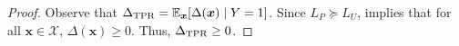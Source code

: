 \corollaryOne*

    \begin{proof}
        Observe that \(\Delta_{\mathrm{TPR}} = \operatorname*{\mathbb{E}}_{\bm{x}}[\Delta(\bm{x}) \mid Y = 1]\). Since $L_P \succeq L_U$,  implies that for all $\bm{x} \in \mathcal{X}$, $\Delta(\bm{x}) \geq 0$. Thus, \(\Delta_{\mathrm{TPR}} \geq 0\).
        
    
    \end{proof}
    
